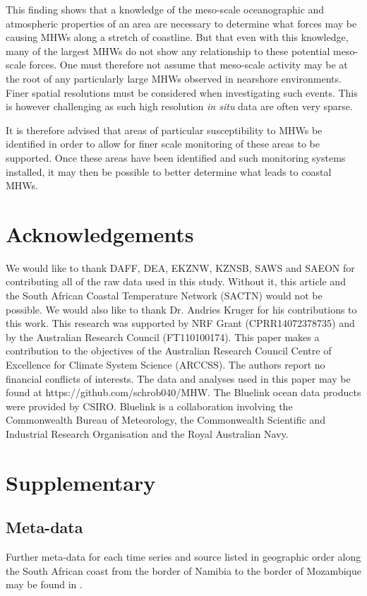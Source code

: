 \documentclass[a4paper,10pt,review]{elsarticle}
\begin{document}
This finding shows that a knowledge of the meso-scale oceanographic and atmospheric properties of an area are necessary to determine what forces may be causing MHWs along a stretch of coastline. But that even with this knowledge, many of the largest MHWs do not show any relationship to these potential meso-scale forces. One must therefore not assume that meso-scale activity may be at the root of any particularly large MHWs observed in nearshore environments. Finer spatial resolutions must be considered when investigating such events. This is however challenging as such high resolution \emph{in situ} data are often very sparse.

It is therefore advised that areas of particular susceptibility to MHWs be identified in order to allow for finer scale monitoring of these areas to be supported. Once these areas have been identified and such monitoring systems installed, it may then be possible to better determine what leads to coastal MHWs. 

\section*{Acknowledgements}
We would like to thank DAFF, DEA, EKZNW, KZNSB, SAWS and SAEON for contributing all of the raw data used in this study. Without it, this article and the South African Coastal Temperature Network (SACTN) would not be possible. We would also like to thank Dr. Andries Kruger for his contributions to this work. This research was supported by NRF Grant (CPRR14072378735) and by the Australian Research Council (FT110100174). This paper makes a contribution to the objectives of the Australian Research Council Centre of Excellence for Climate System Science (ARCCSS). The authors report no financial conflicts of interests. The data and analyses used in this paper may be found at https://github.com/schrob040/MHW. The Bluelink ocean data products were provided by CSIRO. Bluelink is a collaboration involving the Commonwealth Bureau of Meteorology, the Commonwealth Scientific and Industrial Research Organisation and the Royal Australian Navy.

\section*{Supplementary}
\subsection*{Meta-data}
Further meta-data for each time series and source listed in geographic order along the South African coast from the border of Namibia to the border of Mozambique may be found in .
\end{document}
